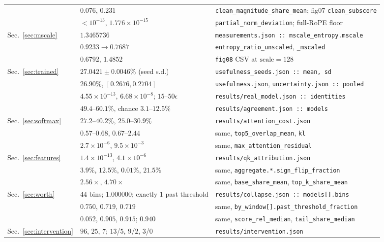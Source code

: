 \documentclass{article}
\theoremstyle{plain}
\theoremstyle{remark}
\begin{document}
\begin{table}[t]
\begin{tabular}{lll}
 & $0.076$, $0.231$ & \texttt{clean\_magnitude\_share\_mean}; fig07 \texttt{clean\_subscore} \\
 & $<10^{-13}$, $1.776\!\times\!10^{-15}$ & \texttt{partial\_norm\_deviation}; full-RoPE floor \\
Sec.~\ref{sec:mscale} & $1.3465736$ & \texttt{measurements.json :: mscale\_entropy.mscale} \\
 & $0.9233 \to 0.7687$ & \texttt{entropy\_ratio\_unscaled}, \texttt{\_mscaled} \\
 & $0.6792$, $1.4852$ & \texttt{fig08} CSV at $\mathrm{scale} = 128$ \\
Sec.~\ref{sec:trained} & $27.0421 \pm 0.0046\%$ (seed s.d.) & \texttt{usefulness\_seeds.json :: mean, sd} \\
 & $26.90\%$, $[0.2676, 0.2704]$ & \texttt{usefulness.json}, \texttt{uncertainty.json :: pooled} \\
 & $4.55\!\times\!10^{-13}$, $6.68\!\times\!10^{-8}$; $15$--$50\epsilon$ & \texttt{results/real\_model.json :: identities} \\
 & $49.4$--$60.1\%$, chance $3.1$--$12.5\%$ & \texttt{results/agreement.json :: models} \\
Sec.~\ref{sec:softmax} & $27.2$--$40.2\%$, $25.0$--$30.9\%$ & \texttt{results/attention\_cost.json} \\
 & $0.57$--$0.68$, $0.67$--$2.44$ & same, \texttt{top5\_overlap\_mean}, \texttt{kl} \\
 & $2.7\!\times\!10^{-6}$, $9.5\!\times\!10^{-3}$ & same, \texttt{max\_attention\_residual} \\
Sec.~\ref{sec:features} & $1.4\!\times\!10^{-13}$, $4.1\!\times\!10^{-6}$ & \texttt{results/qk\_attribution.json} \\
 & $3.9\%$, $12.5\%$, $0.01\%$, $21.5\%$ & same, \texttt{aggregate.*.sign\_flip\_fraction} \\
 & $2.56\times$, $4.70\times$ & same, \texttt{base\_share\_mean}, \texttt{top\_k\_share\_mean} \\
Sec.~\ref{sec:worth} & $44$ bins; $1.000000$; exactly $1$ past threshold & \texttt{results/collapse.json :: models[].bins} \\
 & $0.750$, $0.719$, $0.719$ & same, \texttt{by\_window[].past\_threshold\_fraction} \\
 & $0.052$, $0.905$, $0.915$; $0.940$ & same, \texttt{score\_rel\_median}, \texttt{tail\_share\_median} \\
Sec.~\ref{sec:intervention} & $96$, $25$, $7$; $13$/$5$, $9$/$2$, $3$/$0$ & \texttt{results/intervention.json} \\

\end{tabular}
\end{table}
\end{document}
